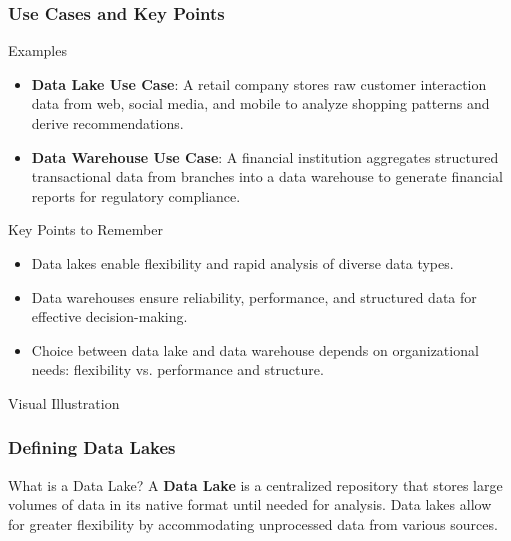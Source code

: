 \documentclass[aspectratio=169]{beamer}
\begin{document}
\begin{frame}[fragile]
    \frametitle{Use Cases and Key Points}
    
    \begin{block}{Examples}
        \begin{itemize}
            \item \textbf{Data Lake Use Case}: A retail company stores raw customer interaction data from web, social media, and mobile to analyze shopping patterns and derive recommendations.
            \item \textbf{Data Warehouse Use Case}: A financial institution aggregates structured transactional data from branches into a data warehouse to generate financial reports for regulatory compliance.
        \end{itemize}
    \end{block}
    
    \begin{block}{Key Points to Remember}
        \begin{itemize}
            \item Data lakes enable flexibility and rapid analysis of diverse data types.
            \item Data warehouses ensure reliability, performance, and structured data for effective decision-making.
            \item Choice between data lake and data warehouse depends on organizational needs: flexibility vs. performance and structure.
        \end{itemize}
    \end{block}
    
    \begin{block}{Visual Illustration}
    \end{block}
\end{frame}

\begin{frame}[fragile]
    \frametitle{Defining Data Lakes}
    \begin{block}{What is a Data Lake?}
        A \textbf{Data Lake} is a centralized repository that stores large volumes of data in its native format until needed for analysis. Data lakes allow for greater flexibility by accommodating unprocessed data from various sources.
    \end{block}
\end{frame}
\end{document}
